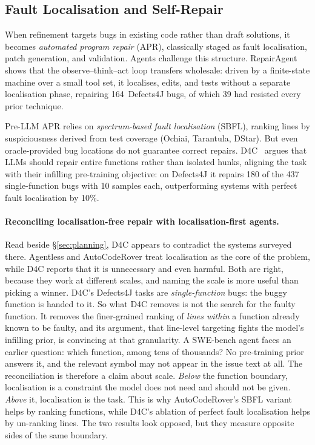 \documentclass[
  english,        %
  font=times,     %
  twocolumn,      %
]{tumarticle}
\begin{document}
\subsection{Fault Localisation and Self-Repair}
\label{sec:fault-localization}

When refinement targets bugs in existing code rather than draft solutions, it
becomes \emph{automated program repair} (APR), classically staged as fault
localisation, patch generation, and validation. Agents challenge this structure.
RepairAgent~\cite{bouzenia2025repairagent} shows that the observe--think--act loop
transfers wholesale: driven by a finite-state machine over a small tool set, it
localises, edits, and tests without a separate localisation phase, repairing
164~Defects4J bugs, of which 39 had resisted every prior technique.

Pre-LLM APR relies on \emph{spectrum-based fault localisation} (SBFL), ranking
lines by suspiciousness derived from test coverage (Ochiai, Tarantula, DStar). But
even oracle-provided bug locations do not guarantee correct repairs.
D4C~\cite{xu2024d4c} argues that LLMs should repair entire functions rather than
isolated hunks, aligning the task with their infilling pre-training objective: on
Defects4J it repairs 180 of the 437 single-function bugs with 10 samples each,
outperforming systems with perfect fault localisation by 10\%.

\paragraph{Reconciling localisation-free repair with localisation-first agents.}
Read beside \S\ref{sec:planning}, D4C appears to contradict the systems surveyed
there. Agentless and AutoCodeRover treat localisation as the core of the problem,
while D4C reports that it is unnecessary and even harmful. Both are right, because
they work at different scales, and naming the scale is more useful than picking a
winner. D4C's Defects4J tasks are \emph{single-function} bugs: the buggy function
is handed to it. So what D4C removes is not the search for the faulty function. It
removes the finer-grained ranking of \emph{lines within} a function already known
to be faulty, and its argument, that line-level targeting fights the model's
infilling prior, is convincing at that granularity. A SWE-bench agent faces an
earlier question: which function, among tens of thousands? No pre-training prior
answers it, and the relevant symbol may not appear in the issue text at all. The
reconciliation is therefore a claim about scale. \emph{Below} the function
boundary, localisation is a constraint the model does not need and should not be
given. \emph{Above} it, localisation is the task. This is why AutoCodeRover's SBFL
variant helps by ranking functions, while D4C's ablation of perfect fault
localisation helps by un-ranking lines. The two results look opposed, but they
measure opposite sides of the same boundary.
\end{document}
